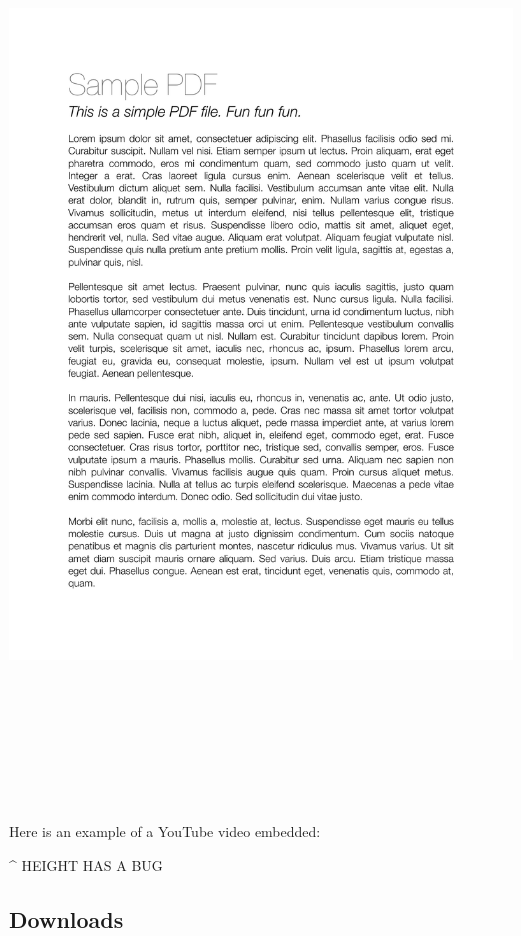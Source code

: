 \documentclass[
]{book}
\begin{document}
\includegraphics[width=1\textwidth,height=9.375in]{content-files/sample-pdf.pdf}~

Here is an example of a YouTube video embedded:

\^{} HEIGHT HAS A BUG

\subsection{Downloads}\label{downloads}
\end{document}
